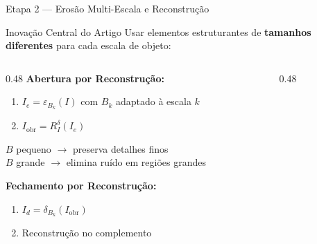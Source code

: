 \documentclass[aspectratio=169,12pt]{beamer}
\begin{document}
\begin{frame}{Etapa 2 --- Eros\~ao Multi-Escala e Reconstru\c{c}\~ao}

\begin{block}{Inova\c{c}\~ao Central do Artigo}
Usar elementos estruturantes de \textbf{tamanhos diferentes} para cada escala de objeto:
\end{block}

\begin{columns}[T]
\begin{column}{0.48\textwidth}
\textbf{Abertura por Reconstru\c{c}\~ao:}
\begin{enumerate}
  \item $I_e = \varepsilon_{B_k}(I)$ com $B_k$ adaptado \`a escala $k$
  \item $I_{\mathrm{obr}} = R^{\delta}_I(I_e)$
\end{enumerate}
\vspace{0.2cm}
$B$ pequeno $\to$ preserva detalhes finos\\
$B$ grande $\to$ elimina ru\'ido em regi\~oes grandes

\vspace{0.3cm}
\textbf{Fechamento por Reconstru\c{c}\~ao:}
\begin{enumerate}
  \item $I_d = \delta_{B_k}(I_{\mathrm{obr}})$
  \item Reconstru\c{c}\~ao no complemento
\end{enumerate}
\end{column}
\begin{column}{0.48\textwidth}
\centering
{}
\end{column}
\end{columns}
\end{frame}
\end{document}
